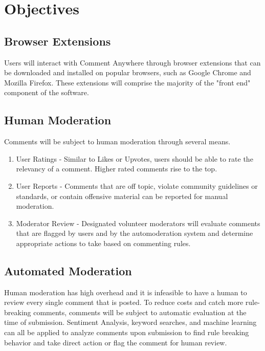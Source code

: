 \documentclass[proposal.tex]{subfiles}
\begin{document}
    
\section{Objectives}

\subsection{Browser Extensions}

Users will interact with Comment Anywhere through browser extensions that can be downloaded and installed on popular browsers, such as Google Chrome and Mozilla Firefox. These extensions will comprise the majority of the "front end" component of the software. 

\subsection{Human Moderation}

Comments will be subject to human moderation through several means.

\begin{enumerate}
    \item User Ratings - Similar to Likes or Upvotes, users should be able to rate the relevancy of a comment. Higher rated comments rise to the top.
    \item User Reports - Comments that are off topic, violate community guidelines or standards, or contain offensive material can be reported for manual moderation.
    \item Moderator Review - Designated volunteer moderators will evaluate comments that are flagged by users and by the automoderation system and determine appropriate actions to take based on commenting rules.
\end{enumerate}

\subsection{Automated Moderation}

Human moderation has high overhead and it is infeasible to have a human to review every single comment that is posted. To reduce costs and catch more rule-breaking comments, comments will be subject to automatic evaluation at the time of submission. Sentiment Analysis, keyword searches, and machine learning can all be applied to analyze comments upon submission to find rule breaking behavior and take direct action or flag the comment for human review.
\end{document}
